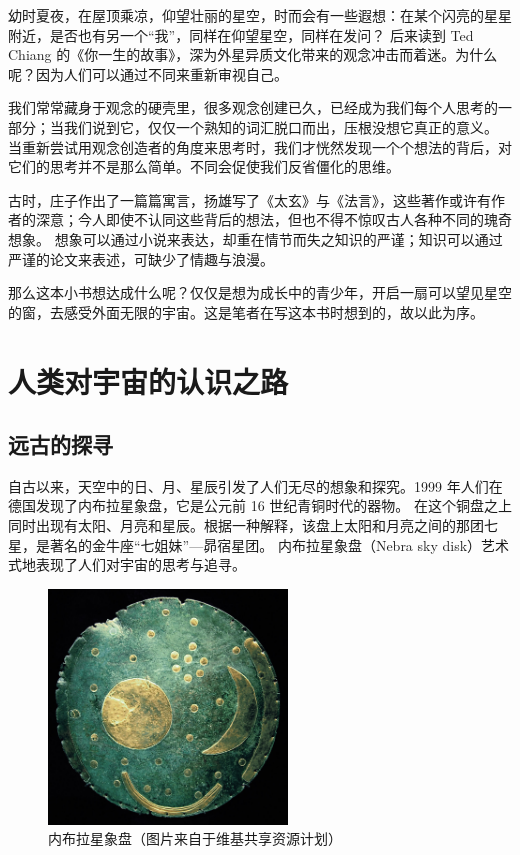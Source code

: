 \documentclass[a4paper,10.5pt]{book}
\begin{document}
幼时夏夜，在屋顶乘凉，仰望壮丽的星空，时而会有一些遐想：在某个闪亮的星星附近，是否也有另一个“我”，同样在仰望星空，同样在发问？
后来读到 Ted Chiang 的《你一生的故事》，深为外星异质文化带来的观念冲击而着迷。为什么呢？因为人们可以通过不同来重新审视自己。

我们常常藏身于观念的硬壳里，很多观念创建已久，已经成为我们每个人思考的一部分；当我们说到它，仅仅一个熟知的词汇脱口而出，压根没想它真正的意义。
当重新尝试用观念创造者的角度来思考时，我们才恍然发现一个个想法的背后，对它们的思考并不是那么简单。不同会促使我们反省僵化的思维。

古时，庄子作出了一篇篇寓言，扬雄写了《太玄》与《法言》，这些著作或许有作者的深意；今人即使不认同这些背后的想法，但也不得不惊叹古人各种不同的瑰奇想象。
想象可以通过小说来表达，却重在情节而失之知识的严谨；知识可以通过严谨的论文来表述，可缺少了情趣与浪漫。

那么这本小书想达成什么呢？仅仅是想为成长中的青少年，开启一扇可以望见星空的窗，去感受外面无限的宇宙。这是笔者在写这本书时想到的，故以此为序。

\newpage

\setlength{\parindent}{0em}
\setlength{\parskip}{0em}

\renewcommand\contentsname{目录}
\tableofcontents
\thispagestyle{empty}

\newpage

\setcounter{page}{1} %

\setlength{\parindent}{0em}
\setlength{\parskip}{1em}

\chapter{人类对宇宙的认识之路}

\section{远古的探寻}

自古以来，天空中的日、月、星辰引发了人们无尽的想象和探究。1999 年人们在德国发现了内布拉星象盘，它是公元前 16 世纪青铜时代的器物。
在这个铜盘之上同时出现有太阳、月亮和星辰。根据一种解释，该盘上太阳和月亮之间的那团七星，是著名的金牛座“七姐妹”—昴宿星团。
内布拉星象盘（Nebra sky disk）艺术式地表现了人们对宇宙的思考与追寻。\cite{pasztor2007interpretation}

\begin{figure}[ht]
\centering
\includegraphics[width=2.5in]{images/1_01-Nebra_sky_disk.jpg}
\caption{内布拉星象盘（图片来自于维基共享资源计划）}
\end{figure}
\end{document}
